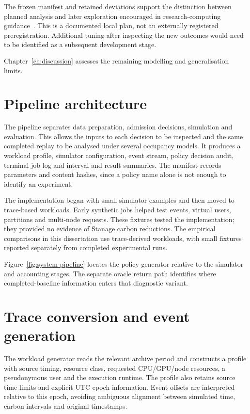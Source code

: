 The frozen manifest and retained deviations support the distinction between planned analysis and later exploration encouraged in research-computing guidance~\cite{souter2023recommendations}. This is a documented local plan, not an externally registered preregistration. Additional tuning after inspecting the new outcomes would need to be identified as a subsequent development stage.

Chapter~\ref{ch:discussion} assesses the remaining modelling and generalisation limits.


\section{Pipeline architecture}
The pipeline separates data preparation, admission decisions, simulation and evaluation. This allows the inputs to each decision to be inspected and the same completed replay to be analysed under several occupancy models. It produces a workload profile, simulator configuration, event stream, policy decision audit, terminal job log and interval and result summaries. The manifest records parameters and content hashes, since a policy name alone is not enough to identify an experiment.

The implementation began with small simulator examples and then moved to trace-based workloads. Early synthetic jobs helped test events, virtual users, partitions and multi-node requests. These fixtures tested the implementation; they provided no evidence of Stanage carbon reductions. The empirical comparisons in this dissertation use trace-derived workloads, with small fixtures reported separately from completed experimental runs.

Figure~\ref{fig:system-pipeline} locates the policy generator relative to the simulator and accounting stages. The separate oracle return path identifies where completed-baseline information enters that diagnostic variant.


\section{Trace conversion and event generation}
The workload generator reads the relevant archive period and constructs a profile with source timing, resource class, requested CPU/GPU/node resources, a pseudonymous user and the execution runtime. The profile also retains source time limits and explicit UTC epoch information. Event offsets are interpreted relative to this epoch, avoiding ambiguous alignment between simulated time, carbon intervals and original timestamps.

